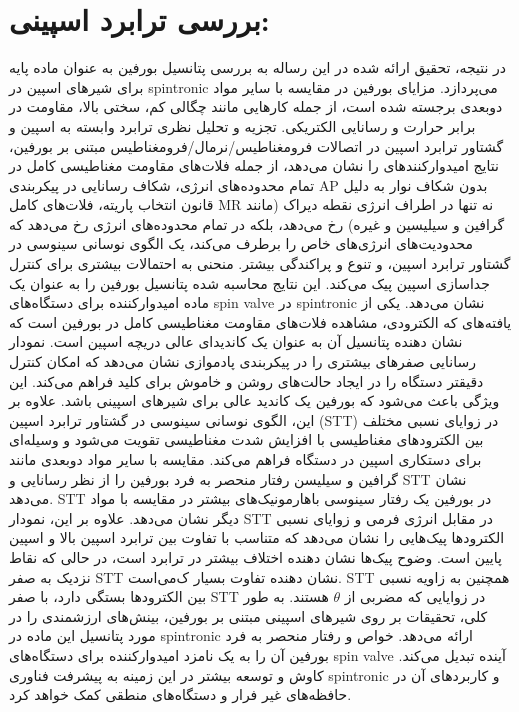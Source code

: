 \section{بررسی ترابرد اسپینی:}
در نتیجه، تحقیق ارائه شده در این رساله به بررسی پتانسیل ‌بورفین به عنوان ماده پایه برای شیرهای اسپین در \gls{spintronic} ‌‌می‌‌پردازد. مزایای ‌بورفین در مقایسه با سایر مواد دوبعدی برجسته شده است، از جمله کارهایی مانند چگالی کم، سختی بالا، مقاومت در برابر حرارت و رسانایی الکتریکی. تجزیه و تحلیل نظری ترابرد وابسته به اسپین و گشتاور ترابرد اسپین در اتصالات فرومغناطیس/نرمال/فرومغناطیس مبتنی بر ‌بورفین، نتایج ا‌میدوارکنندهای را نشان ‌می‌دهد، از جمله فلات‌های مقاومت مغناطیسی کامل در تمام محدوده‌های انرژی، شکاف رسانایی در پیکربندی \gls{AP} بدون شکاف نوار به دلیل قانون انتخاب پاریته، فلات‌های کامل \gls{MR} نه تنها در اطراف انرژی نقطه دیراک (مانند گرافین و سیلیسین و غیره) رخ ‌‌می‌‌دهد، بلکه در تمام محدوده‌های انرژی رخ ‌‌می‌‌دهد که محدودیت‌های انرژی‌های خاص را برطرف ‌‌می‌‌کند، یک الگوی نوسانی سینوسی در گشتاور ترابرد اسپین، و تنوع و پراکندگی بیشتر. منحنی  به احتمالات بیشتری برای کنترل جداسازی اسپین پیک ‌می‌کند. این نتایج محاسبه شده پتانسیل ‌بورفین را به عنوان یک ماده ا‌میدوارکننده برای دستگاه‌های \gls{spin valve} در \gls{spintronic} نشان ‌می‌دهد. یکی از یافته‌های که الکترودی، مشاهده فلات‌های مقاومت مغناطیسی کامل در ‌بورفین است که نشان دهنده پتانسیل آن به عنوان یک کاندیدای عالی دریچه اسپین است. نمودار رسانایی صفرهای بیشتری را در پیکربندی پاد‌موازی نشان ‌می‌دهد که امکان کنترل دقیقتر دستگاه را در ایجاد حالت‌های روشن و خاموش برای کلید فراهم ‌می‌کند. این ویژگی باعث ‌‌می‌‌شود که ‌بورفین یک کاندید عالی برای شیرهای اسپینی باشد. علاوه بر این، الگوی نوسانی سینوسی در گشتاور ترابرد اسپین (\gls{STT}) در زوایای نسبی مختلف بین الکترودهای مغناطیسی با افزایش شدت مغناطیسی تقویت ‌می‌شود و وسیله‌ای برای دستکاری اسپین در دستگاه فراهم ‌می‌کند. مقایسه با سایر مواد دوبعدی مانند گرافین و سیلیسن رفتار منحصر به فرد ‌بورفین را از نظر رسانایی و \gls{STT} نشان ‌‌می‌‌دهد. \gls{STT} در ‌بورفین یک رفتار سینوسی با‌هارمونیک‌های بیشتر در مقایسه با مواد دیگر نشان ‌‌می‌‌دهد. علاوه بر این، نمودار \gls{STT} در مقابل انرژی فر‌‌می‌‌ و زوایای نسبی الکترودها پیک‌هایی را نشان ‌می‌دهد که متناسب با تفاوت بین ترابرد اسپین بالا و اسپین پایین است. وضوح پیک‌ها نشان دهنده اختلاف بیشتر در ترابرد است، در حالی که نقاط نزدیک به صفر \gls{STT} نشان دهنده تفاوت بسیار ک‌‌می‌‌است. \gls{STT} همچنین به زاویه نسبی بین الکترودها بستگی دارد، با صفر \gls{STT} در زوایایی که مضربی از $\theta$ هستند. به طور کلی، تحقیقات بر روی شیرهای اسپینی مبتنی بر ‌بورفین، بینش‌های ارزشمندی را در مورد پتانسیل این ماده در \gls{spintronic} ارائه ‌‌می‌‌دهد. خواص و رفتار منحصر به فرد ‌بورفین آن را به یک نامزد ا‌میدوارکننده برای دستگاه‌های \gls{spin valve} آینده تبدیل ‌‌می‌‌کند. کاوش و توسعه بیشتر در این ز‌مینه به پیشرفت فناوری \gls{spintronic} و کاربردهای آن در حافظه‌های غیر فرار و دستگاه‌های منطقی کمک خواهد کرد.

